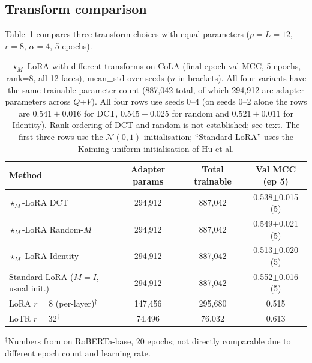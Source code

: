 \documentclass{article}
\theoremstyle{plain}
\begin{document}
\subsection{Transform comparison}
\label{sec:transform_comparison}

Table~\ref{tab:transforms} compares three transform choices with equal parameters
($p = L = 12$, $r = 8$, $\alpha = 4$, 5 epochs).

\begin{table}[h]
\centering
\caption{$\star_M$-LoRA with different transforms on CoLA (final-epoch val MCC, 5 epochs, rank=8, all 12 faces),
mean$\pm$std over seeds ($n$ in brackets).
All four variants have the same trainable parameter count (887,042 total, of which 294,912
are adapter parameters across $Q$+$V$).
All four rows use seeds 0--4 (on seeds 0--2 alone the rows are $0.541\pm0.016$ for DCT, $0.545\pm0.025$ for random and
$0.521\pm0.011$ for Identity).
Rank ordering of DCT and random is not established; see text.
The first three rows use the $\mathcal{N}(0,1)$ initialisation; ``Standard LoRA'' uses the Kaiming-uniform initialisation of Hu et al.}
\label{tab:transforms}
\begin{tabular}{lccc}
\toprule
Method & Adapter params & Total trainable & Val MCC (ep 5) \\
\midrule
$\star_M$-LoRA DCT         & 294,912 & 887,042 & 0.538$\pm$0.015 (5) \\
$\star_M$-LoRA Random-$M$  & 294,912 & 887,042 & 0.549$\pm$0.021 (5) \\
$\star_M$-LoRA Identity    & 294,912 & 887,042 & 0.513$\pm$0.020 (5) \\
Standard LoRA ($M=I$, usual init.) & 294,912 & 887,042 & 0.552$\pm$0.016 (5) \\
\midrule
LoRA $r=8$ (per-layer)$^\dagger$ & 147,456 & 295,680 & 0.515 \\
LoTR $r=32$$^\dagger$            &  74,496 &  76,032 & 0.613 \\
\bottomrule
\end{tabular}
{\small $^\dagger$Numbers from \citet{bershatsky2024lotr} on RoBERTa-base, 20 epochs; not directly comparable
due to different epoch count and learning rate.}
\end{table}
\end{document}
